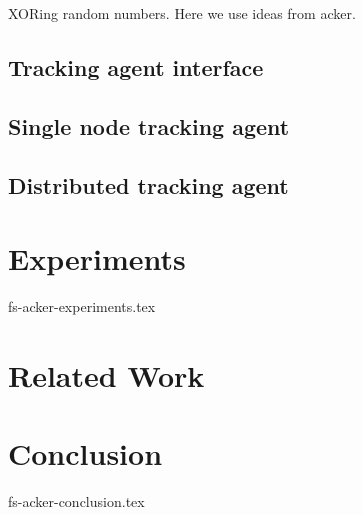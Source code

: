 \documentclass{vldb}
\begin{document}
XORing random numbers. Here we use ideas from acker.

\subsection{Tracking agent interface}

\subsection{Single node tracking agent}

\subsection{Distributed tracking agent}





\section {Experiments}
 {fs-acker-experiments.tex}

\section{Related Work}

\section {Conclusion}
 {fs-acker-conclusion.tex}


% 

\end{document}
